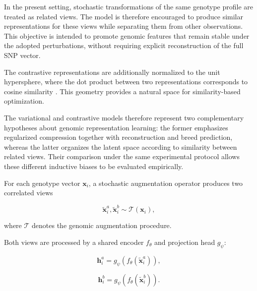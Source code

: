In the present setting, stochastic transformations of the same
genotype profile are treated as related views. The model is therefore
encouraged to produce similar representations for these views while
separating them from other observations. This objective is intended
to promote genomic features that remain stable under the adopted
perturbations, without requiring explicit reconstruction of the full
SNP vector.

The contrastive representations are additionally normalized to the
unit hypersphere, where the dot product between two representations
corresponds to cosine similarity
\cite{wang2020understanding}. This geometry provides a natural space
for similarity-based optimization.

The variational and contrastive models therefore represent two
complementary hypotheses about genomic representation learning:
the former emphasizes regularized compression together with
reconstruction and breed prediction, whereas the latter organizes
the latent space according to similarity between related views.
Their comparison under the same experimental protocol allows these
different inductive biases to be evaluated empirically.

For each genotype vector $\mathbf{x}_i$, a stochastic augmentation
operator produces two correlated views

\begin{equation}
    \tilde{\mathbf{x}}_i^{a},
    \tilde{\mathbf{x}}_i^{b}
    \sim
    \mathcal{T}(\mathbf{x}_i),
    \label{eq:contrastive_views}
\end{equation}

where $\mathcal{T}$ denotes the genomic augmentation procedure.


Both views are processed by a shared encoder $f_{\theta}$ and
projection head $g_{\psi}$:

\begin{equation}
    \mathbf{h}_i^{a}
    =
    g_{\psi}
    \left(
        f_{\theta}
        (
            \tilde{\mathbf{x}}_i^{a}
        )
    \right),
\end{equation}

\begin{equation}
    \mathbf{h}_i^{b}
    =
    g_{\psi}
    \left(
        f_{\theta}
        (
            \tilde{\mathbf{x}}_i^{b}
        )
    \right).
\end{equation}

